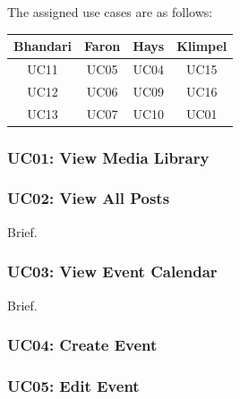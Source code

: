 \documentclass{article}
\begin{document}
The assigned use cases are as follows:

\begin{center}
    \begin{tabular}{ | c | c | c | c | }
        \hline
        Bhandari & Faron & Hays & Klimpel \\
        \hline
        UC11     & UC05  & UC04 & UC15    \\
        \hline
        UC12     & UC06  & UC09 & UC16    \\
        \hline
        UC13     & UC07  & UC10 & UC01    \\
        \hline
    \end{tabular}
\end{center}
\subsubsection{UC01: View Media Library}

\subsubsection{UC02: View All Posts}
Brief.
\subsubsection{UC03: View Event Calendar}
Brief.
\subsubsection{UC04: Create Event}
\subsubsection{UC05: Edit Event}

\end{document}
